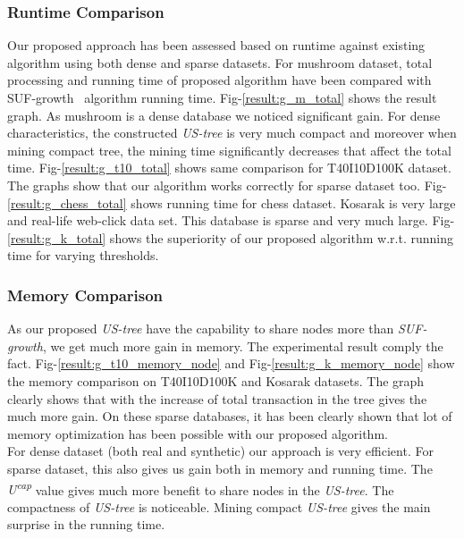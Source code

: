\documentclass[conference]{IEEEtran}
\begin{document}
\subsubsection{Runtime Comparison}
Our proposed approach has been assessed based on runtime against existing algorithm using both dense and sparse datasets. For mushroom dataset, total processing and running time of proposed algorithm have been compared with SUF-growth~\cite{DBLP:conf/icde/LeungH09} algorithm running time. Fig-\ref{result:g_m_total} shows the result graph. As mushroom is a dense database we noticed significant gain. For dense characteristics, the constructed \emph{US-tree} is very much compact and moreover when mining compact tree, the mining time significantly decreases that affect the total time. Fig-\ref{result:g_t10_total} shows same comparison for T40I10D100K dataset. The graphs show that our algorithm works correctly for sparse dataset too. Fig-\ref{result:g_chess_total} shows running time for chess dataset. Kosarak is very large and real-life web-click data set. This database is sparse and very much large. Fig-\ref{result:g_k_total} shows the superiority of our proposed algorithm w.r.t. running time for varying thresholds.    
\subsubsection{Memory Comparison}
As our proposed \emph{US-tree} have the capability to share nodes more than \emph{SUF-growth}, we get much more gain in memory. The experimental result comply the fact. Fig-\ref{result:g_t10_memory_node} and Fig-\ref{result:g_k_memory_node} show the memory comparison on T40I10D100K and Kosarak datasets. The graph clearly shows that with the increase of total transaction in the tree gives the much more gain. On these sparse databases, it has been clearly shown that lot of memory optimization has been possible with our proposed algorithm.\\
For dense dataset (both real and synthetic) our approach is very efficient. For sparse dataset, this also gives us gain both in memory and running time. The \emph{U\textsuperscript{cap}} value gives much more benefit to share nodes in the \emph{US-tree}. The compactness of \emph{US-tree} is noticeable. Mining compact \emph{US-tree} gives the main surprise in the running time.
\end{document}
